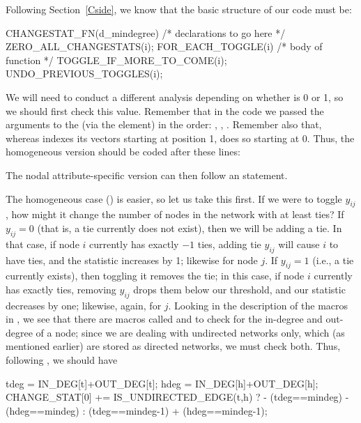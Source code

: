 \documentclass[nojss]{jss}
\begin{document}
Following Section~\ref{Cside}, we know that the basic structure of our
 code must be:
\begin{CodeChunk}
\begin{CodeInput}
CHANGESTAT_FN(d_mindegree) {
  /* declarations to go here */
  ZERO_ALL_CHANGESTATS(i);
  FOR_EACH_TOGGLE(i) {
    /* body of function */
    TOGGLE_IF_MORE_TO_COME(i);
  }
  UNDO_PREVIOUS_TOGGLES(i);
}
\end{CodeInput}
\end{CodeChunk}

We will need to conduct a different analysis depending on whether
 is 0 or 1, so we should first check this value. Remember that in
the  code we passed the arguments to the  (via the
 element) in the order: , ,
.
Remember also that, whereas
 indexes its vectors starting at position 1,  does so
starting at 0.  Thus, the homogeneous version should be coded after these lines:
\begin{CodeChunk}
\begin{CodeInput}
  attrflag = INPUT_PARAM[0];
  mindeg = INPUT_PARAM[1];
  if(attrflag==0){
\end{CodeInput}
\end{CodeChunk}
The nodal attribute-specific version can then follow an  statement.

The homogeneous case () is easier, so let us take this first.
If we were to toggle $y_{ij}$, how might it change the number of nodes in the
network with at least  ties? If $y_{ij}=0$ (that is, a tie
currently does not exist), then we will be adding a tie. In that case, if node
$i$ currently has exactly $-1$ ties, adding tie $y_{ij}$ will cause
$i$ to have  ties, and the statistic increases by 1; likewise for
node $j$. If $y_{ij}=1$ (i.e., a tie currently exists), then toggling it removes
the tie; in this case, if node $i$ currently has exactly  ties,
removing $y_{ij}$ drops them below our threshold, and our statistic decreases by
one; likewise, again, for $j$. Looking in the description of the macros in
, we see that there are macros called  and
 to check for the in-degree and out-degree of a node; since we are
dealing with undirected networks only, which (as mentioned earlier) are stored
as directed networks, we must check both. 
Thus, following 
, we should have
\begin{CodeChunk}
\begin{CodeInput}
      tdeg = IN_DEG[t]+OUT_DEG[t];
      hdeg = IN_DEG[h]+OUT_DEG[h];
      CHANGE_STAT[0] += IS_UNDIRECTED_EDGE(t,h) ?
        - (tdeg==mindeg) - (hdeg==mindeg) :
        (tdeg==mindeg-1) + (hdeg==mindeg-1);
\end{CodeInput}
\end{CodeChunk}
\end{document}

